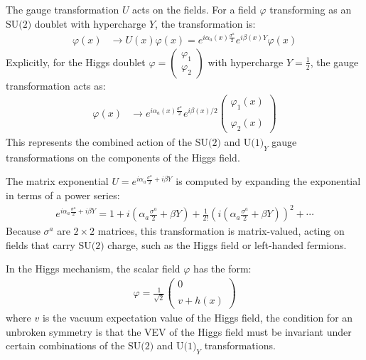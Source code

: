 The gauge transformation $U$ acts on the fields. For a field $\varphi$ transforming as an $\text{SU(2)}$ doublet with hypercharge $Y$, the transformation is:
\begin{align}
    \varphi(x) &\to U(x) \varphi(x) = e^{\displaystyle i \alpha_a(x) \frac{\sigma^a}{2}} e^{\displaystyle i \beta(x) Y} \varphi(x)
\end{align}
Explicitly, for the Higgs doublet $\displaystyle\varphi = \begin{pmatrix} \varphi_1 \\ \varphi_2 \end{pmatrix}$ with hypercharge $\displaystyle Y = \frac{1}{2}$, the gauge transformation acts as:
\begin{align}
    \varphi(x) &\to e^{\displaystyle i \alpha_a(x) \frac{\sigma^a}{2}} e^{\displaystyle i \beta(x) / 2} \begin{pmatrix} \varphi_1(x) \\\\ \varphi_2(x) \end{pmatrix}
\end{align}
This represents the combined action of the $\text{SU(2)}$ and $\text{U(1)}_Y$ gauge transformations on the components of the Higgs field.

The matrix exponential $U = e^{\displaystyle i \alpha_a \frac{\sigma^a}{2} + i \beta Y}$ is computed by expanding the exponential in terms of a power series:
\begin{align}
    e^{\displaystyle i \alpha_a \frac{\sigma^a}{2} + i \beta Y} = 1 + i \left( \alpha_a \frac{\sigma^a}{2} + \beta Y \right) + \frac{1}{2!} \left( i \left( \alpha_a \frac{\sigma^a}{2} + \beta Y \right) \right)^2 + \cdots
\end{align}
Because $\sigma^a$ are $2 \times 2$ matrices, this transformation is matrix-valued, acting on fields that carry $\text{SU(2)}$ charge, such as the Higgs field or left-handed fermions.

In the Higgs mechanism, the scalar field $\varphi$ has the form:
\begin{align*}
    \varphi = \frac{1}{\sqrt{2}} \begin{pmatrix} 0 \\\\ v + h(x) \end{pmatrix}
\end{align*}
where $v$ is the vacuum expectation value of the Higgs field, the condition for an unbroken symmetry is that the VEV of the Higgs field must be invariant under certain combinations of the $\text{SU(2)}$ and $\text{U(1)}_Y$ transformations.

